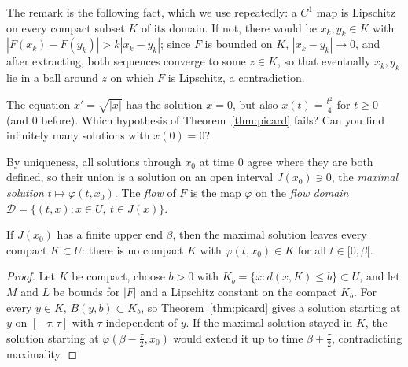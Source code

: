The remark is the following fact, which we use repeatedly: a $C^1$ map is Lipschitz on every compact subset
$K$ of its domain. If not, there would be $x_k,y_k\in K$ with $|F(x_k)-F(y_k)|>k|x_k-y_k|$; since $F$ is bounded on $K$, $|x_k-y_k|\to0$, and after
extracting, both sequences converge to some $z\in K$, so that eventually $x_k,y_k$ lie in a ball around $z$ on which $F$ is Lipschitz, a contradiction.

\begin{think}
The equation $x'=\sqrt{|x|}$ has the solution $x=0$, but also $x(t)=\frac{t^2}4$ for $t\ge0$ (and $0$ before). Which hypothesis of
Theorem~\ref{thm:picard} fails? Can you find infinitely many solutions with $x(0)=0$?
\end{think}

By uniqueness, all solutions through $x_0$ at time $0$ agree where they are both defined, so their union is a solution on an open interval
$J(x_0)\ni0$, the \emph{maximal solution} $t\mapsto\varphi(t,x_0)$. The \emph{flow} of $F$ is the map $\varphi$ on the \emph{flow domain}
$\mathcal D=\{(t,x):x\in U,\ t\in J(x)\}$.

\begin{proposition}\label{prop:escape}
If $J(x_0)$ has a finite upper end $\beta$, then the maximal solution leaves every compact $K\subset U$: there is no compact $K$ with
$\varphi(t,x_0)\in K$ for all $t\in[0,\beta[$.
\end{proposition}
\begin{proof}
Let $K$ be compact, choose $b>0$ with $K_b=\{x:d(x,K)\le b\}\subset U$, and let $M$ and $L$ be bounds for $|F|$ and a Lipschitz constant on the compact
$K_b$. For every $y\in K$, $\bar B(y,b)\subset K_b$, so Theorem~\ref{thm:picard} gives a solution starting at $y$ on $[-\tau,\tau]$ with $\tau$ independent of
$y$. If the maximal solution stayed in $K$, the solution starting at $\varphi(\beta-\frac\tau2,x_0)$ would extend it up to time $\beta+\frac\tau2$,
contradicting maximality.
\end{proof}

